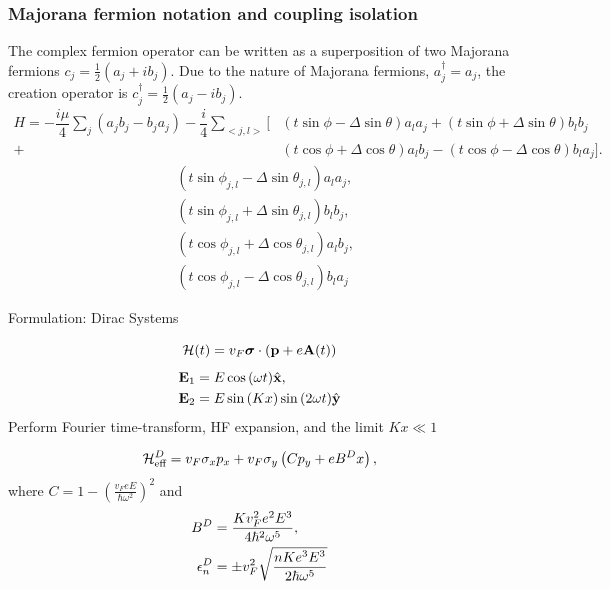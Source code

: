 \documentclass[xcolor=dvipsnames,10pt,aspectratio=169]{beamer}
\let\oldhat\hat
\renewcommand{\hat}[1]{\oldhat{\mathbf{#1}}}
\renewcommand{\vec}[1]{\mathbf{#1}}
\newcommand{\ham}{\mathcal{H}}
\newcommand{\cc}{c^{\dagger}}
\newcommand{\de}{\Delta}
\newcommand{\FO}{Formulation}
\begin{document}
  \begin{frame}
  \frametitle{Majorana fermion notation and coupling isolation}
    The complex fermion operator can be written as a superposition of two Majorana fermions $c_j = \frac{1}{2} (a_j + i b_j)$.
    Due to the nature of Majorana fermions, $a^{\dagger}_j = a_j$, the creation operator is $\cc_j = \frac{1}{2} (a_j - i b_j)$.
    \begin{align*}
      H = -\dfrac{i\mu}{4} \sum_j (a_j b_j - b_j a_j) - \dfrac{i}{4} \sum_{<j,l>} [&(t\sin\phi-\de\sin\theta) a_l a_j + (t\sin\phi+\de\sin\theta) b_l b_j \nonumber \\
      +&(t\cos\phi+\de\cos\theta) a_l b_j - (t\cos\phi-\de\cos\theta) b_l a_j].
    \end{align*}
    \begin{align}
      &(t \sin\phi_{j,l} - \de \sin\theta_{j,l}) a_l a_j, \\
      &(t \sin\phi_{j,l} + \de \sin\theta_{j,l}) b_l b_j, \\
      &(t \cos\phi_{j,l} + \de \cos\theta_{j,l}) a_l b_j, \\
      &(t \cos\phi_{j,l} - \de \cos\theta_{j,l}) b_l a_j
    \end{align}
  \end{frame}

  \begin{frame}{\FO: Dirac Systems}

    \begin{equation}
      \small
      \ham (t) = v_F \bm{\sigma} \cdot \left(\vec{p} + e \vec{A}(t)\right)
    \end{equation}
    \begin{align}
      \small
      \vec{E}_1 &= E\cos{(\omega t)} \hat{x}, \nonumber \\
      \vec{E}_2 &= E\sin{(Kx)}\sin{(2\omega t)} \hat{y}
    \end{align}
    Perform Fourier time-transform, HF expansion, and the limit $Kx\ll1$

    \begin{equation}
      \small
      \ham_{\text{eff}}^{D} = v_F \sigma_x p_x + v_F \sigma_y \left( C p_y + eB^Dx \right),
    \end{equation}
    where $C = 1 - {\left(\tfrac{v_F eE}{\hbar \omega^2}\right)}^2$ and
    \begin{align}
      \small
      B^{D} &= \frac{K v_F^2 e^2 E^3}{4\hbar^2 \omega^5}, \\
      \epsilon_n^{D} &= \pm v_F^2 \sqrt{ \dfrac{n K e^3 E^3}{2 \hbar \omega^5} }
    \end{align}


  \end{frame}
\end{document}
